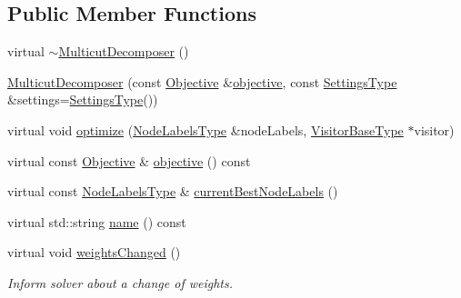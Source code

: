 \subsection*{Public Member Functions}
\begin{DoxyCompactItemize}
\item 
virtual \hyperlink{classnifty_1_1graph_1_1optimization_1_1multicut_1_1MulticutDecomposer_a6f2b07b8ca7cb1e5c4982e9b9e342670}{$\sim$\+Multicut\+Decomposer} ()
\item 
\hyperlink{classnifty_1_1graph_1_1optimization_1_1multicut_1_1MulticutDecomposer_a1e2f73d7be672c9361e474db5d8df6f9}{Multicut\+Decomposer} (const \hyperlink{classnifty_1_1graph_1_1optimization_1_1multicut_1_1MulticutDecomposer_ac952e35144b62e74a0ab4e08a4fbb123}{Objective} \&\hyperlink{classnifty_1_1graph_1_1optimization_1_1multicut_1_1MulticutDecomposer_ac2726619b7a262f230b48dd543a6b72d}{objective}, const \hyperlink{structnifty_1_1graph_1_1optimization_1_1multicut_1_1MulticutDecomposer_1_1SettingsType}{Settings\+Type} \&settings=\hyperlink{structnifty_1_1graph_1_1optimization_1_1multicut_1_1MulticutDecomposer_1_1SettingsType}{Settings\+Type}())
\item 
virtual void \hyperlink{classnifty_1_1graph_1_1optimization_1_1multicut_1_1MulticutDecomposer_af27684dc6a90544177d9c528e007703f}{optimize} (\hyperlink{classnifty_1_1graph_1_1optimization_1_1multicut_1_1MulticutDecomposer_a393f1194615c399b2bbb591c764d036f}{Node\+Labels\+Type} \&node\+Labels, \hyperlink{classnifty_1_1graph_1_1optimization_1_1multicut_1_1MulticutDecomposer_ad1f4a09f99e9fa5ba8ae1bf3227c18f3}{Visitor\+Base\+Type} $\ast$visitor)
\item 
virtual const \hyperlink{classnifty_1_1graph_1_1optimization_1_1multicut_1_1MulticutDecomposer_ac952e35144b62e74a0ab4e08a4fbb123}{Objective} \& \hyperlink{classnifty_1_1graph_1_1optimization_1_1multicut_1_1MulticutDecomposer_ac2726619b7a262f230b48dd543a6b72d}{objective} () const 
\item 
virtual const \hyperlink{classnifty_1_1graph_1_1optimization_1_1multicut_1_1MulticutDecomposer_a393f1194615c399b2bbb591c764d036f}{Node\+Labels\+Type} \& \hyperlink{classnifty_1_1graph_1_1optimization_1_1multicut_1_1MulticutDecomposer_a7afafbe468cb6bdd0e7a7a977ab538b0}{current\+Best\+Node\+Labels} ()
\item 
virtual std\+::string \hyperlink{classnifty_1_1graph_1_1optimization_1_1multicut_1_1MulticutDecomposer_a3648245ab3ec1d06b2db9db4b5502cc8}{name} () const 
\item 
virtual void \hyperlink{classnifty_1_1graph_1_1optimization_1_1multicut_1_1MulticutDecomposer_abadeeec8cacce02560f7e1522f537f0e}{weights\+Changed} ()
\begin{DoxyCompactList}\small\item\em Inform solver about a change of weights. \end{DoxyCompactList}\end{DoxyCompactItemize}



